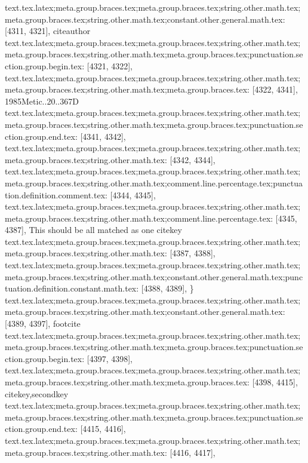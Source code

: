{{{{{{{{{{{{{{{{{{{{{{{{{{{{{{{{{{{{{{{{{{{{{{{{{{{{{{{{{{{{{{{{{{{{{{{{{{{{{{{{{{{{{{{{{{{{{{{{{{{{{{{{{{{{{{{{{{{{{{{{{{{{{{{{{{{{{{{{{text.tex.latex;meta.group.braces.tex;meta.group.braces.tex;string.other.math.tex;meta.group.braces.tex;string.other.math.tex;constant.other.general.math.tex: [4311, 4321], {citeauthor}
text.tex.latex;meta.group.braces.tex;meta.group.braces.tex;string.other.math.tex;meta.group.braces.tex;string.other.math.tex;meta.group.braces.tex;punctuation.section.group.begin.tex: [4321, 4322], {{}
text.tex.latex;meta.group.braces.tex;meta.group.braces.tex;string.other.math.tex;meta.group.braces.tex;string.other.math.tex;meta.group.braces.tex: [4322, 4341], {1985Metic..20..367D}
text.tex.latex;meta.group.braces.tex;meta.group.braces.tex;string.other.math.tex;meta.group.braces.tex;string.other.math.tex;meta.group.braces.tex;punctuation.section.group.end.tex: [4341, 4342], {}}
text.tex.latex;meta.group.braces.tex;meta.group.braces.tex;string.other.math.tex;meta.group.braces.tex;string.other.math.tex: [4342, 4344], {  }
text.tex.latex;meta.group.braces.tex;meta.group.braces.tex;string.other.math.tex;meta.group.braces.tex;string.other.math.tex;comment.line.percentage.tex;punctuation.definition.comment.tex: [4344, 4345], {%
text.tex.latex;meta.group.braces.tex;meta.group.braces.tex;string.other.math.tex;meta.group.braces.tex;string.other.math.tex;comment.line.percentage.tex: [4345, 4387], { This should be all matched as one citekey}
text.tex.latex;meta.group.braces.tex;meta.group.braces.tex;string.other.math.tex;meta.group.braces.tex;string.other.math.tex: [4387, 4388], {
}
text.tex.latex;meta.group.braces.tex;meta.group.braces.tex;string.other.math.tex;meta.group.braces.tex;string.other.math.tex;constant.other.general.math.tex;punctuation.definition.constant.math.tex: [4388, 4389], {\}
text.tex.latex;meta.group.braces.tex;meta.group.braces.tex;string.other.math.tex;meta.group.braces.tex;string.other.math.tex;constant.other.general.math.tex: [4389, 4397], {footcite}
text.tex.latex;meta.group.braces.tex;meta.group.braces.tex;string.other.math.tex;meta.group.braces.tex;string.other.math.tex;meta.group.braces.tex;punctuation.section.group.begin.tex: [4397, 4398], {{}
text.tex.latex;meta.group.braces.tex;meta.group.braces.tex;string.other.math.tex;meta.group.braces.tex;string.other.math.tex;meta.group.braces.tex: [4398, 4415], {citekey,secondkey}
text.tex.latex;meta.group.braces.tex;meta.group.braces.tex;string.other.math.tex;meta.group.braces.tex;string.other.math.tex;meta.group.braces.tex;punctuation.section.group.end.tex: [4415, 4416], {}}
text.tex.latex;meta.group.braces.tex;meta.group.braces.tex;string.other.math.tex;meta.group.braces.tex;string.other.math.tex: [4416, 4417], {
}}}}}}}}}}}}}}}}}}}}}}}}}}}}}}}}}}}}}}}}}}}}}}}}}}}}}}}}}}}}}}}}}}}}}}}}}}}}}}}}}}}}}}}}}}}}}}}}}}}}}}}}}}}}}}}}}}}}}}}}}}}}}}}}}}}}}}}}}}}}
